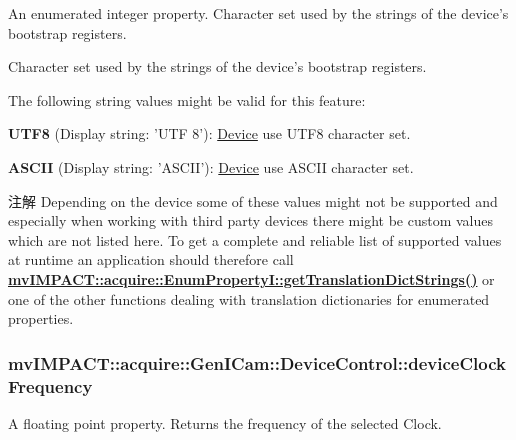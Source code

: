 An enumerated integer property. Character set used by the strings of the device's bootstrap registers. 

Character set used by the strings of the device's bootstrap registers.

The following string values might be valid for this feature\+:
\begin{DoxyItemize}
\item {\bfseries U\+T\+F8} (Display string\+: 'U\+T\+F 8')\+: \hyperlink{classmv_i_m_p_a_c_t_1_1acquire_1_1_device}{Device} use U\+T\+F8 character set.
\item {\bfseries A\+S\+C\+I\+I} (Display string\+: 'A\+S\+C\+I\+I')\+: \hyperlink{classmv_i_m_p_a_c_t_1_1acquire_1_1_device}{Device} use A\+S\+C\+I\+I character set.
\end{DoxyItemize}

\begin{DoxyNote}{注解}
Depending on the device some of these values might not be supported and especially when working with third party devices there might be custom values which are not listed here. To get a complete and reliable list of supported values at runtime an application should therefore call {\bfseries \hyperlink{classmv_i_m_p_a_c_t_1_1acquire_1_1_enum_property_i_a0ba6ccbf5ee69784d5d0b537924d26b6}{mv\+I\+M\+P\+A\+C\+T\+::acquire\+::\+Enum\+Property\+I\+::get\+Translation\+Dict\+Strings()}} or one of the other functions dealing with translation dictionaries for enumerated properties. 
\end{DoxyNote}
\hypertarget{classmv_i_m_p_a_c_t_1_1acquire_1_1_gen_i_cam_1_1_device_control_acd853c8c3a5cbe828d9c7f130224b2e1}{
\subsubsection[{device\+Clock\+Frequency}]{ mv\+I\+M\+P\+A\+C\+T\+::acquire\+::\+Gen\+I\+Cam\+::\+Device\+Control\+::device\+Clock\+Frequency}}\label{classmv_i_m_p_a_c_t_1_1acquire_1_1_gen_i_cam_1_1_device_control_acd853c8c3a5cbe828d9c7f130224b2e1}


A floating point property. Returns the frequency of the selected Clock. 

